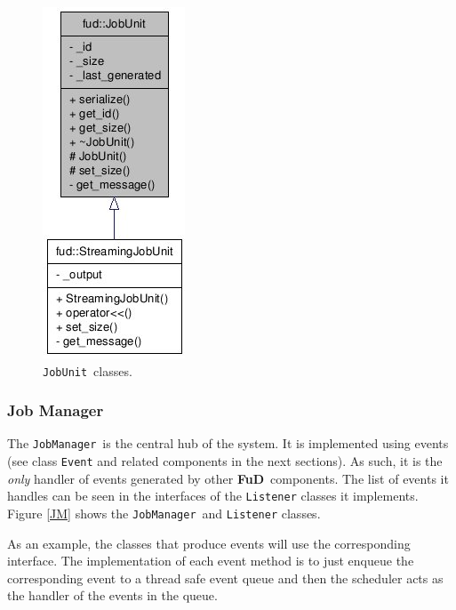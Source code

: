 \documentclass[a4paper,12pt,english]{report}
\newcommand{\fud}{\textbf{FuD}}
\newcommand{\JU}{\texttt{JobUnit}}
\newcommand{\JM}{\texttt{JobManager}}
\begin{document}
\begin{figure}[!ht]
\begin{center}
\includegraphics [bb= 0 0 80 198]{images/JU.jpg}
\end{center}
\caption{\JU \ classes.}
\label{JU}
\end{figure}

\subsubsection{Job Manager}

The \JM \ is the central hub of the system. It is implemented using events (see class \texttt{Event} and related components in the next sections). As such, it is the \emph{only} handler of events generated by other \fud \ components. The list of events it handles can be seen in the interfaces of the \texttt{Listener} classes it implements. Figure \ref{JM} shows the \JM \ and \texttt{Listener} classes.

As an example, the classes that produce events will use the corresponding interface. The implementation of each event method is to just enqueue the corresponding event to a thread safe event queue and then the scheduler acts as the handler of the events in the queue.
\end{document}
